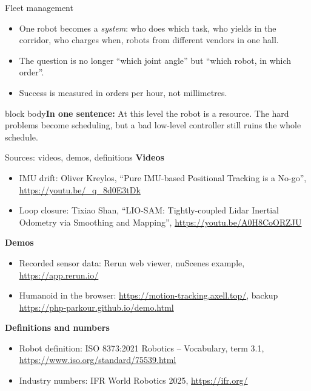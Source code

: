 \documentclass[aspectratio=169]{beamer}
\newcommand{\takeaway}[1]{\vspace{2mm}\begin{beamercolorbox}[rounded=true,sep=4pt,wd=\textwidth]{block body}\footnotesize\textbf{In one sentence:} #1\end{beamercolorbox}}
\begin{document}
\begin{frame}{Fleet management}
	\begin{itemize}
		\item One robot becomes a \emph{system}: who does which task, who yields in the corridor, who charges when, robots from different vendors in one hall.
		\item The question is no longer ``which joint angle'' but ``which robot, in which order''.
		\item Success is measured in orders per hour, not millimetres.
	\end{itemize}
	\takeaway{At this level the robot is a resource. The hard problems become scheduling, but a bad low-level controller still ruins the whole schedule.}
\end{frame}

\begin{frame}{Sources: videos, demos, definitions}
	\scriptsize
	\textbf{Videos}
	\begin{itemize}
		\item IMU drift: Oliver Kreylos, ``Pure IMU-based Positional Tracking is a No-go'', \url{https://youtu.be/_q_8d0E3tDk}
		\item Loop closure: Tixiao Shan, ``LIO-SAM: Tightly-coupled Lidar Inertial Odometry via Smoothing and Mapping'', \url{https://youtu.be/A0H8CoORZJU}
	\end{itemize}
	\textbf{Demos}
	\begin{itemize}
		\item Recorded sensor data: Rerun web viewer, nuScenes example, \url{https://app.rerun.io/}
		\item Humanoid in the browser: \url{https://motion-tracking.axell.top/}, backup \url{https://php-parkour.github.io/demo.html}
	\end{itemize}
	\textbf{Definitions and numbers}
	\begin{itemize}
		\item Robot definition: ISO 8373:2021 Robotics -- Vocabulary, term 3.1, \url{https://www.iso.org/standard/75539.html}
		\item Industry numbers: IFR World Robotics 2025, \url{https://ifr.org/}
	\end{itemize}
\end{frame}
\end{document}
